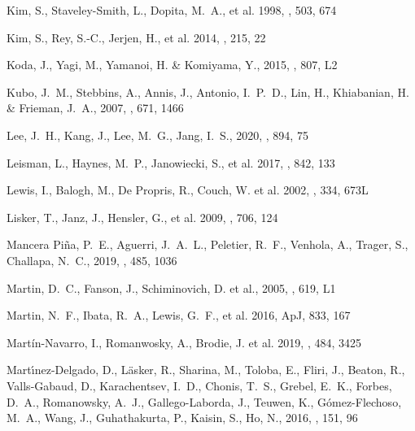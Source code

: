 \documentclass[twocolumn,tighten]{aastex63}
\begin{document}
\begin{thebibliography}{}
Kim, S., Staveley-Smith, L., Dopita, M.~A., et al. 1998, \apj, 503, 674
	
Kim, S., Rey, S.-C., Jerjen, H., et al. 2014, \apjs, 215, 22
	
{Koda}, J., {Yagi}, M., {Yamanoi}, H. \& {Komiyama}, Y., 2015, \apjl, 807, L2

{Kubo}, J.~M., {Stebbins}, A., {Annis}, J.,  {Antonio}, I.~P.~D., {Lin}, H., {Khiabanian}, H. \& {Frieman}, J.~A., 2007, \apj, 671, 1466

Lee, J.~H., Kang, J., Lee, M.~G., Jang, I.~S., 2020, \apj, 894, 75

Leisman, L., Haynes, M.~P., Janowiecki, S., et al. 2017, \apj, 842, 133

Lewis, I., Balogh, M., De Propris, R., Couch, W. et al. 2002, \mnras, 334, 673L

Lisker, T., Janz, J., Hensler, G., et al. 2009, \apj, 706, 124





Mancera Pi\~{n}a, P.~E., Aguerri, J.~A.~L., Peletier, R.~F., Venhola, A., Trager, S., Challapa, N.~C., 2019, \mnras, 485, 1036

{Martin, D.~C., Fanson, J., Schiminovich, D. et al., 2005, \apj, 619, L1}

Martin, N.~F., Ibata, R.~A., Lewis, G.~F., et al. 2016, ApJ, 833, 167

Mart\'in-Navarro, I., Romanwosky, A., Brodie, J. et al. 2019, \mnras, 484, 3425

{Mart{\'{\i}}nez-Delgado}, D., {L{\"a}sker}, R., {Sharina}, M., {Toloba}, E., {Fliri}, J., {Beaton}, R., {Valls-Gabaud}, D., {Karachentsev}, I.~D., {Chonis}, T.~S., {Grebel}, E.~K., {Forbes}, D.~A., {Romanowsky}, A.~J., {Gallego-Laborda}, J., {Teuwen}, K., {G{\'o}mez-Flechoso}, M.~A., {Wang}, J., {Guhathakurta}, P., {Kaisin}, S., {Ho}, N., 2016, \ap, 151, 96


\end{thebibliography}
\end{document}
